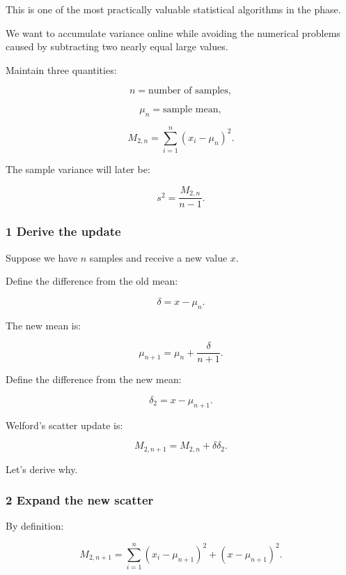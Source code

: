 \hypertarget{02-foundations-ii-ch030-welfords-numerically-stable-variance-algorithm}{}

This is one of the most practically valuable statistical algorithms in the phase.

We want to accumulate variance online while avoiding the numerical problems caused by subtracting two nearly equal large values.

Maintain three quantities:

\[
 n=\text{number of samples},
\]

\[
 \mu_n=\text{sample mean},
\]

\[
 M_{2,n}= \sum_{i=1}^{n}(x_i-\mu_n)^2.
\]

The sample variance will later be:

\[
 s^2=\frac{M_{2,n}}{n-1}.
\]

\subsubsection{1 Derive the update}\label{02-foundations-ii-ch030-derive-the-update}

\hypertarget{02-foundations-ii-ch030-derive-the-update}{}

Suppose we have \(n\) samples and receive a new value \(x\).

Define the difference from the old mean:

\[
 \boxed{\delta=x-\mu_n}.
\]

The new mean is:

\[
 \boxed{ \mu_{n+1} = \mu_n+\frac{\delta}{n+1} }.
\]

Define the difference from the new mean:

\[
 \boxed{ \delta_2=x-\mu_{n+1} }.
\]

Welford's scatter update is:

\[
 \boxed{ M_{2,n+1} = M_{2,n}+\delta\delta_2 }.
\]

Let's derive why.

\subsubsection{2 Expand the new scatter}\label{02-foundations-ii-ch030-expand-the-new-scatter}

\hypertarget{02-foundations-ii-ch030-expand-the-new-scatter}{}

By definition:

\[
 M_{2,n+1} = \sum_{i=1}^{n}(x_i-\mu_{n+1})^2 + (x-\mu_{n+1})^2.
\]

